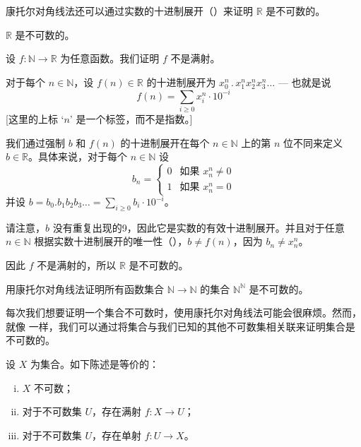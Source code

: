 康托尔对角线法还可以通过实数的十进制展开（）来证明 $\mathbb{R}$ 是不可数的。

\begin{theorem}
\label{thmRIsUncountable}
$\mathbb{R}$ 是不可数的。
\end{theorem}

\begin{cproof}
设 $f : \mathbb{N} \to \mathbb{R}$ 为任意函数。我们证明 $f$ 不是满射。

对于每个 $n \in \mathbb{N}$，设 $f(n) \in \mathbb{R}$ 的十进制展开为 $x_0^n \,.\, x_1^n x_2^n x_3^n \dots$ --- 也就是说
\[ f(n) = \sum_{i \ge 0} x_i^n \cdot 10^{-i} \]
[这里的上标 `$n$' 是一个标签，而不是指数。]

我们通过强制 $b$ 和 $f(n)$ 的十进制展开在每个 $n \in \mathbb{N}$ 上的第 $n$ 位不同来定义 $b \in \mathbb{R}$。具体来说，对于每个 $n \in \mathbb{N}$ 设
\[ b_n = \begin{cases} 0 & \text{如果 } x_n^n \ne 0 \\ 1 & \text{如果 } x_n^n = 0 \end{cases} \]
并设 $b = b_0. b_1 b_2 b_3 \dots{} = \sum_{i \ge 0} b_i \cdot 10^{-i}$。

请注意，$b$ 没有重复出现的9，因此它是实数的有效十进制展开。并且对于任意 $n \in \mathbb{N}$ 根据实数十进制展开的唯一性（），$b \ne f(n)$，因为 $b_n \ne x_n^n$。

因此 $f$ 不是满射的，所以 $\mathbb{R}$ 是不可数的。
\end{cproof}

\begin{exercise}
用康托尔对角线法证明所有函数集合 $\mathbb{N} \to \mathbb{N}$ 的集合 $\mathbb{N}^{\mathbb{N}}$ 是不可数的。
\end{exercise}

每次我们想要证明一个集合不可数时，使用康托尔对角线法可能会很麻烦。然而，就像  一样，我们可以通过将集合与我们已知的其他不可数集相关联来证明集合是不可数的。

\begin{theorem}
\label{thmUncountableFromInjSurj}
设 $X$ 为集合。如下陈述是等价的：
\begin{enumerate}[(i)]
\item $X$ 不可数；
\item \label{testitem} 对于不可数集 $U$，存在满射 $f : X \to U$；
\item 对于不可数集 $U$，存在单射 $f : U \to X$。
\end{enumerate}
\end{theorem}

